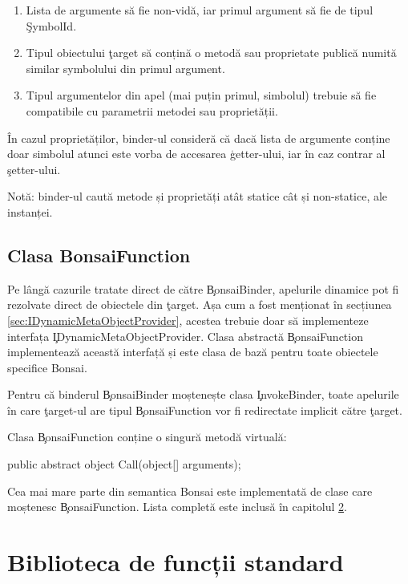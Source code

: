 \documentclass[12pt,a4paper]{memoir}
\begin{document}
\begin{enumerate}
\item Lista de argumente să fie non-vidă, iar primul argument să fie de tipul \c{SymbolId}.
\item Tipul obiectului \c{target} să conțină o metodă sau proprietate publică numită similar symbolului din primul argument.
\item Tipul argumentelor din apel (mai puțin primul, simbolul) trebuie să fie compatibile cu parametrii metodei sau proprietății.
\end{enumerate}

În cazul proprietăților, binder-ul consideră că dacă lista de argumente conține doar simbolul atunci este vorba de accesarea \c{getter}-ului, iar în caz contrar al \c{setter}-ului. 

Notă: binder-ul caută metode și proprietăți atât statice cât și non-statice, ale instanței. 

\section{Clasa BonsaiFunction}

Pe lângă cazurile tratate direct de către \c{BonsaiBinder}, apelurile dinamice pot fi rezolvate direct de obiectele din \c{target}. Așa cum a fost menționat în secțiunea \ref{sec:IDynamicMetaObjectProvider}, acestea trebuie doar să implementeze interfața \c{IDynamicMetaObjectProvider}. Clasa abstractă \c{BonsaiFunction} implementează această interfață și este clasa de bază pentru toate obiectele specifice Bonsai.

Pentru că binderul \c{BonsaiBinder} moștenește clasa \c{InvokeBinder}, toate apelurile în care \c{target}-ul are tipul \c{BonsaiFunction} vor fi redirectate implicit către \c{target}.

Clasa \c{BonsaiFunction} conține o singură metodă virtuală:
\begin{code}
  public abstract object Call(object[] arguments);
\end{code}

Cea mai mare parte din semantica Bonsai este implementată de clase care moștenesc \c{BonsaiFunction}. Lista completă este inclusă în capitolul \ref{ch:StandardLibrary}.


\chapter{Biblioteca de funcții standard}\label{ch:StandardLibrary}
\end{document}
